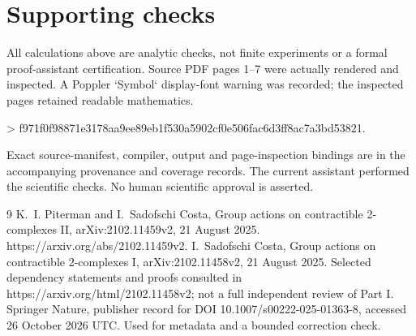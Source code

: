 \documentclass[10pt]{article}
\begin{document}
\section*{Supporting checks}
All calculations above are analytic checks, not finite experiments or a formal proof-assistant certification. Source PDF pages 1–7 were actually rendered and inspected. A Poppler `Symbol` display-font warning was recorded; the inspected pages retained readable mathematics.\par
> f971f0f98871e3178aa9ee89eb1f530a5902cf0e506fac6d3ff8ac7a3bd53821.\par
Exact source-manifest, compiler, output and page-inspection bindings are in the accompanying provenance and coverage records. The current assistant performed the scientific checks. No human scientific approval is asserted.\par
9 K. I. Piterman and I. Sadofschi Costa, Group actions on contractible 2-complexes II, arXiv:2102.11459v2, 21 August 2025. https://arxiv.org/abs/2102.11459v2. I. Sadofschi Costa, Group actions on contractible 2-complexes I, arXiv:2102.11458v2, 21 August 2025. Selected dependency statements and proofs consulted in https://arxiv.org/html/2102.11458v2; not a full independent review of Part I. Springer Nature, publisher record for DOI 10.1007/s00222-025-01363-8, accessed 26 October 2026 UTC. Used for metadata and a bounded correction check.\par
\end{document}
